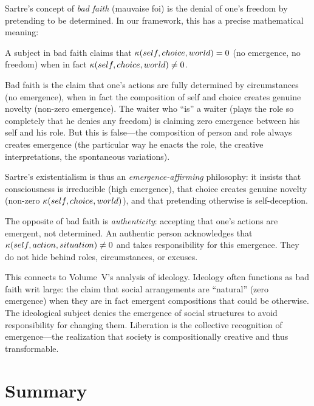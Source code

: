Sartre's concept of \emph{bad faith} (mauvaise foi) is the denial of one's
freedom by pretending to be determined. In our framework, this has a precise
mathematical meaning:

\begin{theorem}
\label{thm:bad-faith}
A subject in bad faith claims that $\kappa(self, choice, world) = 0$ (no
emergence, no freedom) when in fact $\kappa(self, choice, world) \neq 0$.
\end{theorem}

\begin{interpretation}
Bad faith is the claim that one's actions are fully determined by circumstances
(no emergence), when in fact the composition of self and choice creates genuine
novelty (non-zero emergence). The waiter who ``is'' a waiter (plays the role so
completely that he denies any freedom) is claiming zero emergence between his
self and his role. But this is false---the composition of person and role always
creates emergence (the particular way he enacts the role, the creative interpretations,
the spontaneous variations).

Sartre's existentialism is thus an \emph{emergence-affirming} philosophy: it
insists that consciousness is irreducible (high emergence), that choice creates
genuine novelty (non-zero $\kappa(self, choice, world)$), and that pretending
otherwise is self-deception.

The opposite of bad faith is \emph{authenticity}: accepting that one's actions
are emergent, not determined. An authentic person acknowledges that
$\kappa(self, action, situation) \neq 0$ and takes responsibility for this
emergence. They do not hide behind roles, circumstances, or excuses.

This connects to Volume~V's analysis of ideology. Ideology often functions as
bad faith writ large: the claim that social arrangements are ``natural'' (zero
emergence) when they are in fact emergent compositions that could be otherwise.
The ideological subject denies the emergence of social structures to avoid
responsibility for changing them. Liberation is the collective recognition of
emergence---the realization that society is compositionally creative and thus
transformable.
\end{interpretation}


\section{Summary}

